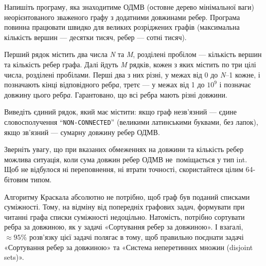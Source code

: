 ﻿Напишіть програму, яка знаходитиме ОДМВ (остовне дерево мінімальної ваги) неорієнтованого зваженого графу з додатними довжинами ребер. Програма повинна працювати швидко для великих розріджених графів (максимальна кількість вершин --- десятки тисяч, ребер --- сотні тисяч).

\InputFile
Перший рядок містить два числа {\it N} та {\it M}, розділені пробілом --- кількість вершин та кількість ребер графа. Далі йдуть {\it M} рядків, кожен з яких містить по три цілі числа, розділені пробілами. Перші два з них різні, у межах від 0 до {\it N}–1 кожне, і позначають кінці відповідного ребр{\it а}, третє — у межах від 1 до $10^9$ і позначає довжину цього ребр{\it а}. Гарантовано, що всі р{\it е}бра мають різні довжини.

\OutputFile
Виведіть єдиний рядок, який має містити: якщо граф незв'язний --- єдине словосполучення ``{\tt NON-CONNECTED}'' (великими латинськими буквами, без лапок), якщо зв'язний --- сумарну довжину ребер ОДМВ.

\Examples

\begin{example}
\end{example}

\Note

Зверніть увагу, що при вказаних обмеженнях на довжини та кількість ребер можлива ситуація, коли сума довжин ребер ОДМВ не~поміщається у тип int. Щоб не відбулося ні переповнення, ні втрати точності, скористайтеся цілим 64-бітовим типом.

Алгоритму Краскала абсолютно не потрібно, щоб граф був поданий списками суміжності. Тому, на відміну від попередніх графових задач, формувати при читанні графа списки суміжності недоцільно. Натомість, потрібно сортувати ребра за довжиною, як у задачі «Сортування ребер за довжиною». І взагалі, $\approx95\%$ розв'язку цієї задачі полягає в тому, щоб правильно поєднати задачі «Сортування ребер за довжиною» та «Система неперетинних множин (disjoint sets)».